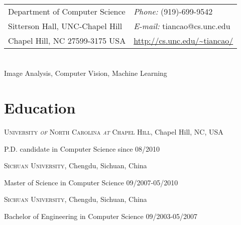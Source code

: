 \documentclass[line,margin]{res}
\newenvironment{list1}{
  \begin{list}{\ding{113}}{%
      \setlength{\itemsep}{0in}
      \setlength{\parsep}{0in} \setlength{\parskip}{0in}
      \setlength{\topsep}{0in} \setlength{\partopsep}{0in} 
      \setlength{\leftmargin}{0.17in}}}{\end{list}}
\begin{document}

\begin{resume}
\section{}
\vspace{.05in}
\begin{tabular}{@{}p{3in}p{3in}}
Department of Computer Science & {\it Phone:}  (919)-699-9542 \\            
Sitterson Hall, UNC-Chapel Hill & {\it E-mail:}  tiancao@cs.unc.edu \\
Chapel Hill, NC 27599-3175 USA&  \url{http://cs.unc.edu/~tiancao/} \\
\end{tabular}
 
\section{}       
\smallskip

Image Analysis, Computer Vision, Machine Learning

\section{\sc Education}
\smallskip

\textsc{University \textit{of} North Carolina \textit{at} Chapel Hill}, Chapel Hill, NC, USA\\
\vspace*{-.1in}
\begin{list1}
\item[] P.D. candidate in Computer Science \hfill{since 08/2010}
\end{list1}
 
\textsc{Sichuan University}, Chengdu, Sichuan, China\\
\vspace*{-.1in}
\begin{list1}
\item[] Master of Science in Computer Science \hfill {09/2007-05/2010} %
\end{list1}
 
 \textsc{Sichuan University}, Chengdu, Sichuan, China\\
 \vspace*{-.1in}
 \begin{list1}
 \item[] Bachelor of Engineering in Computer Science \hfill{09/2003-05/2007}  %
 \end{list1}
 

\end{resume}
\end{document}
